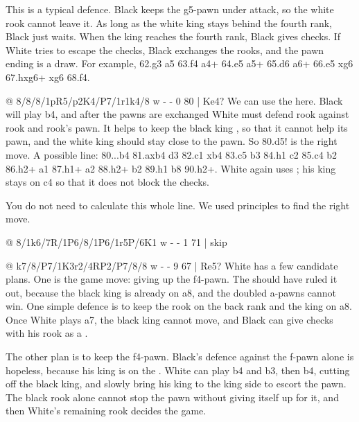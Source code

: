 This is a typical defence. Black keeps the g5-pawn under attack, so the white rook cannot leave
it. As long as the white king stays behind the fourth rank, Black just waits. When the king
reaches the fourth rank, Black gives checks. If White tries to escape the checks, Black exchanges
the rooks, and the pawn ending is a draw. For example, 62.\K g3 \R a5 63.\K f4 \R a4+ 64.\K e5
\R a5+ 65.\K d6 \R a6+ 66.\K e5 \R xg6 67.hxg6+ \K xg6 68.\K f4.

@ 8/8/8/1pR5/p2K4/P7/1r1k4/8 w - - 0 80 | Ke4?
We can use the  here.
Black will play b4, and after the pawns are exchanged White must defend rook against rook and
rook's pawn. It helps to keep the black king , so that it
cannot help its pawn, and the white king should stay close to the pawn. So 80.\K d5! is the right
move. A possible line: 80...b4 81.axb4 \K d3 82.\R c1 \R xb4 83.\K c5 \R b3 84.\R h1 \K c2 85.\K c4
\K b2 86.\R h2+ \K a1 87.\R h1+ \K a2 88.\R h2+ \R b2 89.\R h1 \R b8 90.\R h2+. White again uses
; his king stays on c4 so that it does not block
the checks.

You do not need to calculate this whole line. We used principles to find the right move.

@ 8/1k6/7R/1P6/8/1P6/1r5P/6K1 w - - 1 71 | skip

@ k7/8/P7/1K3r2/4RP2/P7/8/8 w - - 9 67 | Re5?
White has a few candidate plans. One is the game move: giving up the f4-pawn. The
 should have ruled it out,
because the black king is already on a8, and the doubled a-pawns cannot win. One simple defence
is to keep the rook on the back rank and the king on a8. Once White plays a7, the black king
cannot move, and Black can give checks with his rook as a .

The other plan is to keep the f4-pawn. Black's defence against the f-pawn alone is hopeless,
because his king is on the . White can play \K b4 and
\K b3, then \R b4, cutting off the black king, and slowly bring his king
to the king side to escort the pawn. The black rook alone cannot stop the pawn without giving
itself up for it, and then White's remaining rook decides the game.

